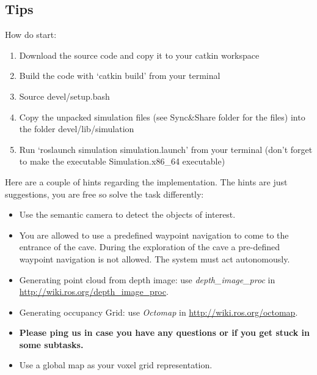 \documentclass{article}
\begin{document}
\subsection{Tips}
How do start:
\begin{enumerate}
\item Download the source code and copy it to your catkin workspace
\item Build the code with `catkin build' from your terminal
\item Source devel/setup.bash
\item Copy the unpacked simulation files (see Sync\&Share folder for the files) into the folder devel/lib/simulation
\item Run `roslaunch simulation simulation.launch' from your terminal (don't forget to make the executable Simulation.x86\_64 executable)
\end{enumerate}

Here are a couple of hints regarding the implementation. The hints are just suggestions, you are free so solve the task differently:
\begin{itemize}
\item Use the semantic camera to detect the objects of interest.
\item You are allowed to use a predefined waypoint navigation to come to the entrance of the cave. During the exploration of the cave a pre-defined waypoint navigation is not allowed. The system must act autonomously.
\item Generating point cloud from depth image: use \textit{depth\_image\_proc} in \url{http://wiki.ros.org/depth_image_proc}.
\item Generating occupancy Grid: use \textit{Octomap} in \url{http://wiki.ros.org/octomap}.
\item \textbf{Please ping us in case you have any questions or if you get stuck in some subtasks.}
\item Use a global map as your voxel grid representation.
\end{itemize}






%
%
\end{document}

